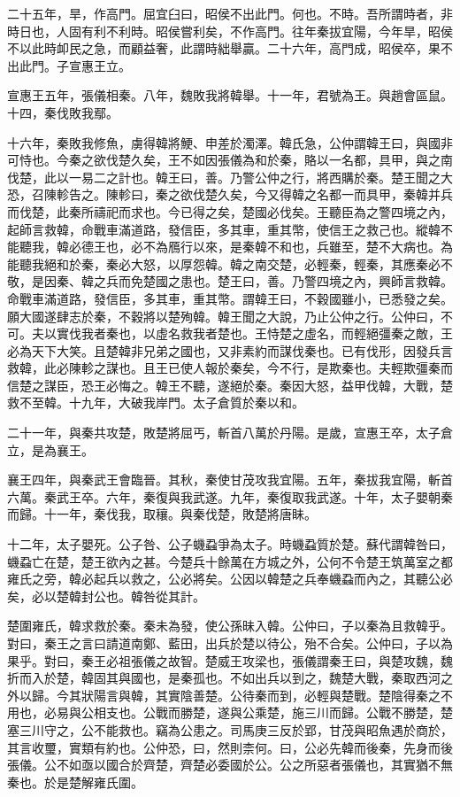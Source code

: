 二十五年，旱，作高門。屈宜臼曰，昭侯不出此門。何也。不時。吾所謂時者，非時日也，人固有利不利時。昭侯嘗利矣，不作高門。往年秦拔宜陽，今年旱，昭侯不以此時卹民之急，而顧益奢，此謂時絀舉贏。二十六年，高門成，昭侯卒，果不出此門。子宣惠王立。

宣惠王五年，張儀相秦。八年，魏敗我將韓舉。十一年，君號為王。與趙會區鼠。十四，秦伐敗我鄢。

十六年，秦敗我修魚，虜得韓將鯁、申差於濁澤。韓氏急，公仲謂韓王曰，與國非可恃也。今秦之欲伐楚久矣，王不如因張儀為和於秦，賂以一名都，具甲，與之南伐楚，此以一易二之計也。韓王曰，善。乃警公仲之行，將西購於秦。楚王聞之大恐，召陳軫告之。陳軫曰，秦之欲伐楚久矣，今又得韓之名都一而具甲，秦韓并兵而伐楚，此秦所禱祀而求也。今已得之矣，楚國必伐矣。王聽臣為之警四境之內，起師言救韓，命戰車滿道路，發信臣，多其車，重其幣，使信王之救己也。縱韓不能聽我，韓必德王也，必不為鴈行以來，是秦韓不和也，兵雖至，楚不大病也。為能聽我絕和於秦，秦必大怒，以厚怨韓。韓之南交楚，必輕秦，輕秦，其應秦必不敬，是因秦、韓之兵而免楚國之患也。楚王曰，善。乃警四境之內，興師言救韓。命戰車滿道路，發信臣，多其車，重其幣。謂韓王曰，不穀國雖小，已悉發之矣。願大國遂肆志於秦，不穀將以楚殉韓。韓王聞之大說，乃止公仲之行。公仲曰，不可。夫以實伐我者秦也，以虛名救我者楚也。王恃楚之虛名，而輕絕彊秦之敵，王必為天下大笑。且楚韓非兄弟之國也，又非素約而謀伐秦也。已有伐形，因發兵言救韓，此必陳軫之謀也。且王已使人報於秦矣，今不行，是欺秦也。夫輕欺彊秦而信楚之謀臣，恐王必悔之。韓王不聽，遂絕於秦。秦因大怒，益甲伐韓，大戰，楚救不至韓。十九年，大破我岸門。太子倉質於秦以和。

二十一年，與秦共攻楚，敗楚將屈丐，斬首八萬於丹陽。是歲，宣惠王卒，太子倉立，是為襄王。

襄王四年，與秦武王會臨晉。其秋，秦使甘茂攻我宜陽。五年，秦拔我宜陽，斬首六萬。秦武王卒。六年，秦復與我武遂。九年，秦復取我武遂。十年，太子嬰朝秦而歸。十一年，秦伐我，取穰。與秦伐楚，敗楚將唐眛。

十二年，太子嬰死。公子咎、公子蟣蝨爭為太子。時蟣蝨質於楚。蘇代謂韓咎曰，蟣蝨亡在楚，楚王欲內之甚。今楚兵十餘萬在方城之外，公何不令楚王筑萬室之都雍氏之旁，韓必起兵以救之，公必將矣。公因以韓楚之兵奉蟣蝨而內之，其聽公必矣，必以楚韓封公也。韓咎從其計。

楚圍雍氏，韓求救於秦。秦未為發，使公孫昧入韓。公仲曰，子以秦為且救韓乎。對曰，秦王之言曰請道南鄭、藍田，出兵於楚以待公，殆不合矣。公仲曰，子以為果乎。對曰，秦王必祖張儀之故智。楚威王攻梁也，張儀謂秦王曰，與楚攻魏，魏折而入於楚，韓固其與國也，是秦孤也。不如出兵以到之，魏楚大戰，秦取西河之外以歸。今其狀陽言與韓，其實陰善楚。公待秦而到，必輕與楚戰。楚陰得秦之不用也，必易與公相支也。公戰而勝楚，遂與公乘楚，施三川而歸。公戰不勝楚，楚塞三川守之，公不能救也。竊為公患之。司馬庚三反於郢，甘茂與昭魚遇於商於，其言收璽，實類有約也。公仲恐，曰，然則柰何。曰，公必先韓而後秦，先身而後張儀。公不如亟以國合於齊楚，齊楚必委國於公。公之所惡者張儀也，其實猶不無秦也。於是楚解雍氏圍。

